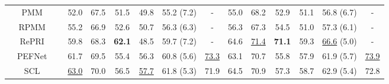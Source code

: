 \documentclass[runningheads,table,xcdraw]{llncs}
\begin{document}
\begin{table*}[t]
{\begin{tabular}{ccccccccccccccc}
\multicolumn{1}{c|}{}                            & \multicolumn{1}{c|}{PMM~\cite{yang2020prototype}}                   & \multicolumn{1}{c|}{}                            & 52.0          & 67.5          & 51.5          & \multicolumn{1}{c|}{49.8}          & \multicolumn{1}{c|}{55.2 (7.2)}          & \multicolumn{1}{c|}{-}             & 55.0          & 68.2          & 52.9          & \multicolumn{1}{c|}{51.1}          & \multicolumn{1}{c|}{56.8 (6.7)}          & -             \\
\multicolumn{1}{c|}{}                            & \multicolumn{1}{c|}{RPMM~\cite{yang2020prototype}}                  & \multicolumn{1}{c|}{}                            & 55.2          & 66.9          & 52.6          & \multicolumn{1}{c|}{50.7}          & \multicolumn{1}{c|}{56.3 (6.3)}          & \multicolumn{1}{c|}{-}             & 56.3          & 67.3          & 54.5          & \multicolumn{1}{c|}{51.0}          & \multicolumn{1}{c|}{57.3 (6.1)}          & -             \\
\multicolumn{1}{c|}{}                            & \multicolumn{1}{c|}{RePRI~\cite{boudiaf2021few}}                    & \multicolumn{1}{c|}{}                            & 59.8          & 68.3          & \textbf{62.1} & \multicolumn{1}{c|}{48.5}          & \multicolumn{1}{c|}{59.7 (7.2)}          & \multicolumn{1}{c|}{-}             & 64.6          & \uline{71.4}  & \textbf{71.1} & \multicolumn{1}{c|}{59.3}          & \multicolumn{1}{c|}{\uline{66.6} (5.0)}  & -             \\
\multicolumn{1}{c|}{}                            & \multicolumn{1}{c|}{PEFNet~\cite{tian2020prior}}                    & \multicolumn{1}{c|}{}                            & 61.7          & 69.5          & 55.4          & \multicolumn{1}{c|}{56.3}          & \multicolumn{1}{c|}{60.8 (5.6)}          & \multicolumn{1}{c|}{\uline{73.3}}  & 63.1          & 70.7          & 55.8          & \multicolumn{1}{c|}{57.9}          & \multicolumn{1}{c|}{61.9 (5.7)}          & \uline{73.9}  \\
\multicolumn{1}{c|}{}                            & \multicolumn{1}{c|}{SCL~\cite{zhang2021self}}                       & \multicolumn{1}{c|}{}                            & \uline{63.0}  & 70.0          & 56.5          & \multicolumn{1}{c|}{\uline{57.7}}  & \multicolumn{1}{c|}{61.8 (5.3)}          & \multicolumn{1}{c|}{71.9}          & 64.5          & 70.9          & 57.3          & \multicolumn{1}{c|}{58.7}          & \multicolumn{1}{c|}{62.9 (5.4)}          & 72.8          \\

\end{tabular}}
\end{table*}
\end{document}
